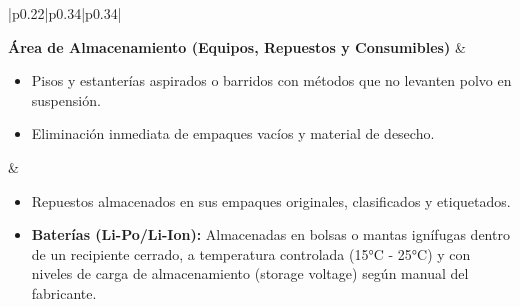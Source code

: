 \begin{longtable}{|p{0.22\textwidth}|p{0.34\textwidth}|p{0.34\textwidth}|}
\vspace{2pt} \raggedright \textbf{Área de Almacenamiento (Equipos, Repuestos y Consumibles)} & 
\begin{minipage}[t]{\linewidth}
\vspace{2pt}
\raggedright
\begin{itemize}[leftmargin=12pt, topsep=0pt, partopsep=0pt, parsep=0pt, itemsep=4pt]
    \item Pisos y estanterías aspirados o barridos con métodos que no levanten polvo en suspensión.
    \item Eliminación inmediata de empaques vacíos y material de desecho.
\end{itemize}
\vspace{2pt}
\end{minipage} & 
\begin{minipage}[t]{\linewidth}
\vspace{2pt}
\raggedright
\begin{itemize}[leftmargin=12pt, topsep=0pt, partopsep=0pt, parsep=0pt, itemsep=4pt]

    \item Repuestos almacenados en sus empaques originales, clasificados y etiquetados.
    \item \textbf{Baterías (Li-Po/Li-Ion):} Almacenadas en bolsas o mantas ignífugas dentro de un recipiente cerrado, a temperatura controlada (15°C - 25°C) y con niveles de carga de almacenamiento (storage voltage) según manual del fabricante.
\end{itemize}
\vspace{2pt}
\end{minipage} \\ \hline


\end{longtable}
